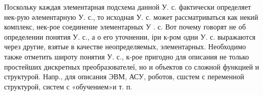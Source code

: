\documentclass[10pt]{article}
\begin{document}
Поскольку каждая элементарная подсхема данной У. с. фактически определяет нек-рую әлементарную У. с., то исходная У. с. может рассматриваться как некий комплекс, нек-рое соединение элементарных У . с. Вот почему говорят не об определении понятия У. с., а о его уточнении, іри к-ром одни У. с. выражаются через другие, взятые в качестве неопределяемых, элементарных. Необходимо также отметить широту понятия У. с., к-рое пригодно для описания не только простейших дискретных преобразователеї, но и объектов со сложной функцией и структурой. Напр., для описания ЭВМ, АСУ, роботов, сшстем с переменной структурой, систем с «обучением»и т. п.
\end{document}
